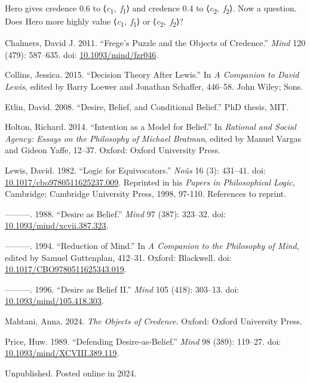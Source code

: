 \documentclass[
  11pt,
  letterpaper,
  DIV=11,
  numbers=noendperiod,
  twoside]{scrartcl}
\newlength{\cslhangindent}
\newenvironment{CSLReferences}[2] %
 {\begin{list}{}{%
  \setlength{\itemindent}{0pt}
  \setlength{\leftmargin}{0pt}
  \setlength{\parsep}{0pt}
  \ifodd #1
   \setlength{\leftmargin}{\cslhangindent}
   \setlength{\itemindent}{-1\cslhangindent}
  \fi
  \setlength{\itemsep}{#2\baselineskip}}}
 {\end{list}}
\begin{document}
Hero gives credence 0.6 to
⟨\emph{c}\textsubscript{1},~\emph{f}\textsubscript{1}⟩ and credence 0.4
to ⟨\emph{c}\textsubscript{2},~\emph{f}\textsubscript{2}⟩. Now a
question. Does Hero more highly value
⟨\emph{c}\textsubscript{1},~\emph{f}\textsubscript{1}⟩ or
⟨\emph{c}\textsubscript{2},~\emph{f}\textsubscript{2}⟩?

\label{refs}
\begin{CSLReferences}{1}{0}
Chalmers, David J. 2011. {``Frege's Puzzle and the Objects of
Credence.''} \emph{Mind} 120 (479): 587--635. doi:
\href{https://doi.org/10.1093/mind/fzr046}{10.1093/mind/fzr046}.

Collins, Jessica. 2015. {``Decision Theory After Lewis.''} In \emph{A
Companion to David Lewis}, edited by Barry Loewer and Jonathan Schaffer,
446--58. John Wiley; Sons.

Etlin, David. 2008. {``Desire, Belief, and Conditional Belief.''} PhD
thesis, MIT.

Holton, Richard. 2014. {``Intention as a Model for Belief.''} In
\emph{Rational and Social Agency: Essays on the Philosophy of Michael
Bratman}, edited by Manuel Vargas and Gideon Yaffe, 12--37. Oxford:
Oxford University Press.

Lewis, David. 1982. {``Logic for Equivocators.''} \emph{No{û}s} 16 (3):
431--41. doi:
\href{https://doi.org/10.1017/cbo9780511625237.009}{10.1017/cbo9780511625237.009}.
Reprinted in his \emph{Papers in Philosophical Logic}, Cambridge:
Cambridge University Press, 1998, 97-110. References to reprint.

---------. 1988. {``Desire as Belief.''} \emph{Mind} 97 (387): 323--32.
doi:
\href{https://doi.org/10.1093/mind/xcvii.387.323}{10.1093/mind/xcvii.387.323}.

---------. 1994. {``Reduction of Mind.''} In \emph{A Companion to the
Philosophy of Mind}, edited by Samuel Guttenplan, 412--31. Oxford:
Blackwell. doi:
\href{https://doi.org/10.1017/CBO9780511625343.019}{10.1017/CBO9780511625343.019}.

---------. 1996. {``Desire as Belief {II}.''} \emph{Mind} 105 (418):
303--13. doi:
\href{https://doi.org/10.1093/mind/105.418.303}{10.1093/mind/105.418.303}.

Mahtani, Anna. 2024. \emph{The Objects of Credence}. Oxford: Oxford
University Press.

Price, Huw. 1989. {``Defending Desire-as-Belief.''} \emph{Mind} 98
(389): 119--27. doi:
\href{https://doi.org/10.1093/mind/XCVIII.389.119}{10.1093/mind/XCVIII.389.119}.

\end{CSLReferences}



\noindent Unpublished. Posted online in 2024.
\end{document}
